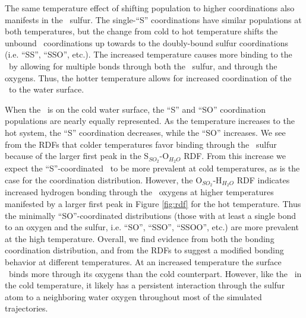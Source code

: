 The same temperature effect of shifting population to higher coordinations also manifests in the \suldiox~sulfur. The single-``S'' coordinations have similar populations at both temperatures, but the change from cold to hot temperature shifts the unbound \suldiox~coordinations up towards to the doubly-bound sulfur coordinations (i.e. ``SS'', ``SSO'', etc.). The increased temperature causes more binding to the \suldiox~by allowing for multiple bonds through both the \suldiox~sulfur, and through the oxygens. Thus, the hotter temperature allows for increased coordination of the \suldiox~to the water surface.

When the \suldiox~is on the cold water surface, the ``S'' and ``SO'' coordination populations are nearly equally represented. As the temperature increases to the hot system, the ``S'' coordination decreases, while the ``SO'' increases. We see from the RDFs that colder temperatures favor binding through the \suldiox~sulfur because of the larger first peak in the S$_{SO_2}$-O$_{H_2O}$ RDF. From this increase we expect the ``S''-coordinated \suldiox~to be more prevalent at cold temperatures, as is the case for the coordination distribution. However, the O$_{SO_2}$-H$_{H_2O}$ RDF indicates increased hydrogen bonding through the \suldiox~oxygens at higher temperatures manifested by a larger first peak in Figure \ref{fig:rdf} for the hot temperature. Thus the minimally ``SO''-coordinated distributions (those with at least a single bond to an oxygen and the sulfur, i.e. ``SO'', ``SSO'', ``SSOO'', etc.) are more prevalent at the high temperature. Overall, we find evidence from both the bonding coordination distribution, and from the RDFs to suggest a modified bonding behavior at different temperatures. At an increased temperature the surface \suldiox~binds more through its oxygens than the cold counterpart. However, like the \suldiox~in the cold temperature, it likely has a persistent interaction through the sulfur atom to a neighboring water oxygen throughout most of the simulated trajectories.
